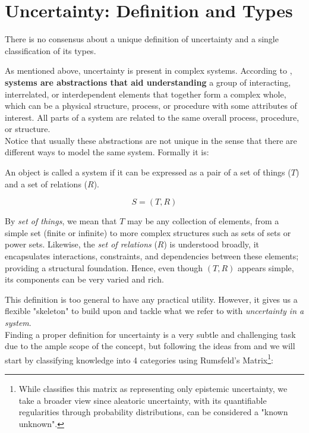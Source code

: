 \section{Uncertainty: Definition and Types}

There is no consensus about a unique definition of uncertainty and a single classification of its types. 

As mentioned above, uncertainty is present in complex systems. According to \cite{UncertaintySciences}, \textbf{systems are abstractions that aid understanding} a group of interacting, interrelated, or interdependent elements that together form a complex whole, which can be a physical structure, process, or procedure with some attributes of interest. All parts of a system are related to the same overall process, procedure, or structure. \\

Notice that usually these abstractions are not unique in the sense that there are different ways to model the same system. Formally it is:

\begin{definition}[System]
    An object is called a system if it can be expressed as a pair of a set of things ($T$) and a set of relations ($R$).

    \[S = (T,R)\]
\end{definition}

\begin{remark}
    By \emph{set of things}, we mean that \(T\) may be any collection of elements, from a simple set (finite or infinite) to more complex structures such as sets of sets or power sets. Likewise, the \emph{set of relations} (\(R\)) is understood broadly, it encapsulates interactions, constraints, and dependencies between these elements; providing a structural foundation. Hence, even though \((T, R)\) appears simple, its components can be very varied and rich.
\end{remark}

This definition is too general to have any practical utility. However, it gives us a flexible "skeleton" to build upon and tackle what we refer to with \textit{uncertainty in a system}. \\

Finding a proper definition for uncertainty is a very subtle and challenging task due to the ample scope of the concept, but following the ideas from \cite{UncertaintySciences} and \cite{RumsfeldMatrix} we will start by classifying knowledge into 4 categories using Rumsfeld's Matrix\footnote{While \cite{RumsfeldMatrix} classifies this matrix as representing only epistemic uncertainty, we take a broader view since aleatoric uncertainty, with its quantifiable regularities through probability distributions, can be considered a "known unknown".}:


